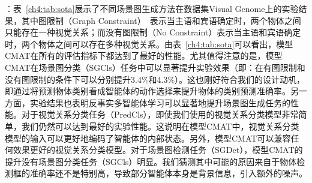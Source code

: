\textbf{}：表~\ref{ch4:tab:sota}展示了不同场景图生成方法在数据集Visual Genome上的实验结果，其中图限制（Graph Constraint）~\cite{zellers2018neural}表示当主语和宾语确定时，两个物体之间只能存在一种视觉关系；而没有图限制（No Constraint）表示当主语和宾语确定时，两个物体之间可以存在多种视觉关系。由表~\ref{ch4:tab:sota}可以看出，模型CMAT在所有的评估指标下都达到了最好的性能。尤其值得注意的是，模型CMAT在场景图分类（SGCls）任务中可以显著提升实验效果（即：在有图限制和没有图限制的条件下可以分别提升3.4\%和4.3\%）。这也刚好符合我们的设计动机，即通过将预测物体类别看成智能体的动作选择来提升物体的类别预测准确率。另一方面，实验结果也表明反事实多智能体学习可以显著地提升场景图生成任务的性能。对于视觉关系分类任务（PredCls），即使我们使用的视觉关系分类模型非常简单，我们仍然可以达到最好的实验性能。这说明在模型CMAT中，视觉关系分类模型的输入可以更好地编码了智能体的内部状态。另外，模型CMAT可以兼容任何效果更好的视觉关系分类模型。对于场景图检测任务（SGDet），模型CMAT的提升没有场景图分类任务（SGCls）明显。我们猜测其中可能的原因来自于物体检测框的准确率还不是特别高，导致部分智能体本身是背景信息，引入额外的噪声。


